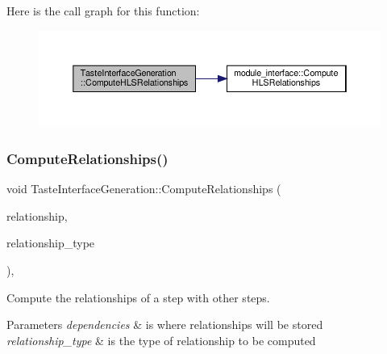 Here is the call graph for this function\+:
\nopagebreak
\begin{figure}[H]
\begin{center}
\leavevmode
\includegraphics[width=350pt]{dc/d30/classTasteInterfaceGeneration_ac81f5d05e67e11e91d4a03e6437a9fc0_cgraph}
\end{center}
\end{figure}
\mbox{\label{classTasteInterfaceGeneration_aef8be37534a1f17bdfdb6c26ff565fac}} 
\subsubsection{\texorpdfstring{Compute\+Relationships()}{ComputeRelationships()}}
{\footnotesize\ttfamily void Taste\+Interface\+Generation\+::\+Compute\+Relationships (\begin{DoxyParamCaption}\item[{\hyperlink{classDesignFlowStepSet}{Design\+Flow\+Step\+Set} \&}]{relationship,  }\item[{const \hyperlink{classDesignFlowStep_a723a3baf19ff2ceb77bc13e099d0b1b7}{Design\+Flow\+Step\+::\+Relationship\+Type}}]{relationship\+\_\+type }\end{DoxyParamCaption})\hspace{0.3cm}{\ttfamily [override]}, {\ttfamily [virtual]}}



Compute the relationships of a step with other steps. 


\begin{DoxyParams}{Parameters}
{\em dependencies} & is where relationships will be stored \\
\hline
{\em relationship\+\_\+type} & is the type of relationship to be computed \\
\hline
\end{DoxyParams}


